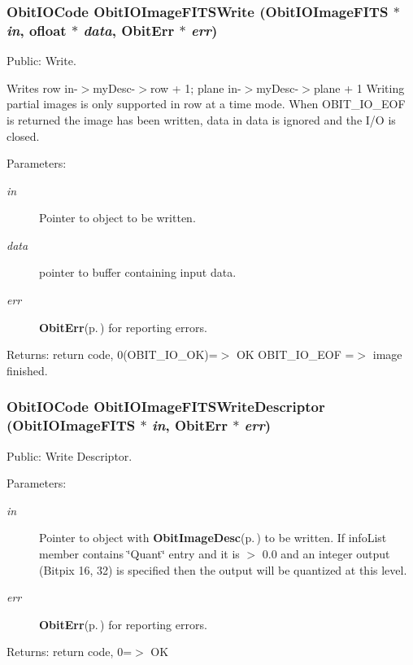 \subsubsection{\setlength{\rightskip}{0pt plus 5cm}Obit\-IOCode Obit\-IOImage\-FITSWrite ({\bf Obit\-IOImage\-FITS} $\ast$ {\em in}, {\bf ofloat} $\ast$ {\em data}, {\bf Obit\-Err} $\ast$ {\em err})}\label{ObitIOImageFITS_8c_a29}


Public: Write. 

Writes row in-$>$my\-Desc-$>$row + 1; plane in-$>$my\-Desc-$>$plane + 1 Writing partial images is only supported in row at a time mode. When OBIT\_\-IO\_\-EOF is returned the image has been written, data in data is ignored and the I/O is closed. \begin{Desc}
\item[Parameters:]
\begin{description}
\item[{\em in}]Pointer to object to be written. \item[{\em data}]pointer to buffer containing input data. \item[{\em err}]{\bf Obit\-Err}{\rm (p.\,\pageref{structObitErr})} for reporting errors. \end{description}
\end{Desc}
\begin{Desc}
\item[Returns:]return code, 0(OBIT\_\-IO\_\-OK)=$>$ OK OBIT\_\-IO\_\-EOF =$>$ image finished. \end{Desc}
\subsubsection{\setlength{\rightskip}{0pt plus 5cm}Obit\-IOCode Obit\-IOImage\-FITSWrite\-Descriptor ({\bf Obit\-IOImage\-FITS} $\ast$ {\em in}, {\bf Obit\-Err} $\ast$ {\em err})}\label{ObitIOImageFITS_8c_a31}


Public: Write Descriptor. 

\begin{Desc}
\item[Parameters:]
\begin{description}
\item[{\em in}]Pointer to object with {\bf Obit\-Image\-Desc}{\rm (p.\,\pageref{structObitImageDesc})} to be written. If info\-List member contains \char`\"{}Quant\char`\"{} entry and it is $>$ 0.0 and an integer output (Bitpix 16, 32) is specified then the output will be quantized at this level. \item[{\em err}]{\bf Obit\-Err}{\rm (p.\,\pageref{structObitErr})} for reporting errors. \end{description}
\end{Desc}
\begin{Desc}
\item[Returns:]return code, 0=$>$ OK \end{Desc}
